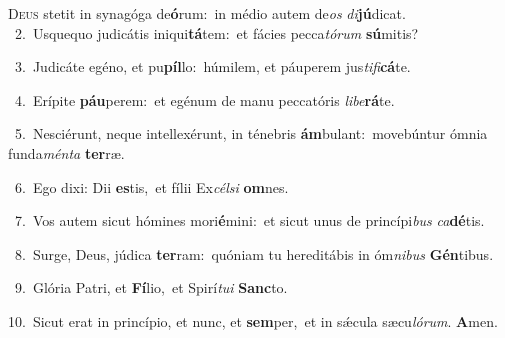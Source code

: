\lettrine{\initial\textcolor{\initialcolor}{D}}{eus} stetit in synagóga de\-\textbf{ó}\-rum:~\star in médio autem de\textit{os} \textit{di}\-\textbf{jú}dicat.\\
{\numbfont\textcolor{\numbcolor}{~2.}}~Usquequo judicátis iniqui\-\textbf{tá}\-tem:~\star et fácies pecca\-\textit{tó}\-\textit{rum} \textbf{sú}\-mitis?\par
{\numbfont\textcolor{\numbcolor}{~3.}}~Judicáte egéno, et pu\-\textbf{píl}\-lo:~\star húmilem, et páuperem jus\-\textit{ti}\-\textit{fi}\textbf{cá}te.\par
{\numbfont\textcolor{\numbcolor}{~4.}}~Erípite \textbf{páu}\-perem:~\star et egénum de manu peccatóris \textit{li}\-\textit{be}\textbf{rá}te.\par
{\numbfont\textcolor{\numbcolor}{~5.}}~Nesciérunt, neque intellexérunt, in ténebris \textbf{ám}\-bulant:~\star movebúntur ómnia funda\-\textit{mén}\-\textit{ta} \textbf{ter}\-ræ.\par
{\numbfont\textcolor{\numbcolor}{~6.}}~Ego dixi: Dii \textbf{es}\-tis,~\star et fílii Ex\-\textit{cél}\-\textit{si} \textbf{om}\-nes.\par
{\numbfont\textcolor{\numbcolor}{~7.}}~Vos autem sicut hómines mori\-\textbf{é}\-mini:~\star et sicut unus de princípi\textit{bus} \textit{ca}\-\textbf{dé}tis.\par
{\numbfont\textcolor{\numbcolor}{~8.}}~Surge, Deus, júdica \textbf{ter}\-ram:~\star quóniam tu hereditábis in óm\-\textit{ni}\-\textit{bus} \textbf{Gén}\-tibus.\par
{\numbfont\textcolor{\numbcolor}{~9.}}~Glória Patri, et \textbf{Fí}\-lio,~\star et Spirí\-\textit{tu}\-\textit{i} \textbf{Sanc}\-to.\par
{\numbfont\textcolor{\numbcolor}{10.}}~Sicut erat in princípio, et nunc, et \textbf{sem}\-per,~\star et in sǽcula sæcu\-\textit{ló}\-\textit{rum}. \textbf{A}\-men.\par
